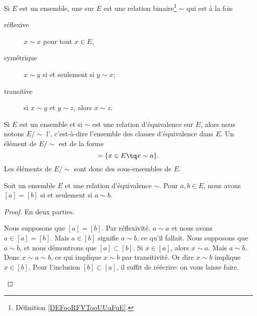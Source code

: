 \begin{definition}  \label{DefHoJzMp}
	Si \( E\) est un ensemble, une  sur \( E\) est une relation binaire\footnote{Définition \ref{DEFooRFVTooUUuFuE}.} \( \sim\) qui est à la fois
	\begin{description}
		\item[réflexive]  \( x\sim x\) pour tout \( x\in E\),
		\item[symétrique] \( x\sim y\) si et seulement si \( y\sim x\);
		\item[transitive] si \( x\sim y\) et \( y\sim z\), alors \( x\sim z\).
	\end{description}
\end{definition}

\begin{definition}      \label{DEFooRHPSooHKBZXl}
	Si \( E\) est un ensemble et si \( \sim\) est une relation d'équivalence sur \( E\), alors nous notons \( E/\sim\) l', c'est-à-dire l'ensemble des classes d'équivalence dans \( E\). Un élément de \( E/\sim\) est de la forme
	\begin{equation}
		[a]=\{ x\in E\tq x\sim a \}.
	\end{equation}
	Les éléments de \( E/\sim\) sont donc des sous-ensembles de \( E \).
\end{definition}

\begin{lemma}		\label{LEMooEgaliteClassesGen}
	Soit un ensemble \( E\) et une relation d'équivalence \( \sim\). Pour \( a,b\in E\), nous avons \( [a]=[b]\) si et seulement si \( a\sim b\).
\end{lemma}

\begin{proof}
	En deux parties.
	\begin{subproof}
		\spitem[\( \Rightarrow\)]
		Nous supposons que \( [a]=[b]\). Par réflexivité, \( a\sim a\) et nous avons \( a\in [a]=[b]\). Mais \( a\in [b]\) signifie \( a\sim b\), ce qu'il fallait.
		\spitem[\( \Leftarrow\)]
		Nous supposons que \( a\sim b\), et nous démontrons que \( [a]\subset [b]\). Si \( x\in [a]\), alors \( x\sim a\). Mais \( a\sim b\). Donc \( x\sim a\sim b\), ce qui implique \( x\sim b\) par transitivité. Or dire \( x\sim b\) implique \( x\in [b]\). Pour l'inclusion \( [b]\subset [a]\), il suffit de réécrire: on vous laisse faire.
	\end{subproof}
\end{proof}


